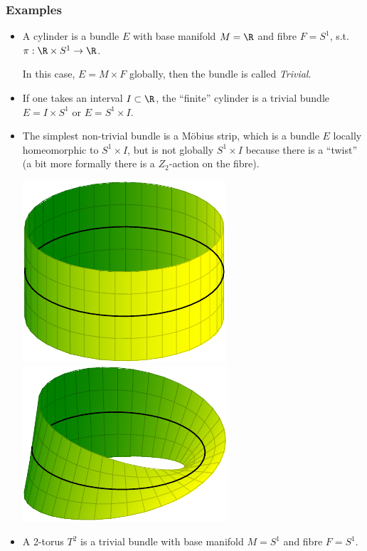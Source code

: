 \subsubsection*{Examples}
\begin{itemize}
\item A cylinder is a bundle $E$ with base manifold $M = \R$ and fibre $F = S^1$, s.t. $\pi: \R \times S^1 \to \R$.
  
  In this case, $E = M \times F$ globally, then the bundle is called \emph{Trivial}.
\item If one takes an interval $I \subset \R$, the ``finite'' cylinder is a trivial bundle $E = I \times S^1$ or $E = S^1 \times I$.
\item The simplest non-trivial bundle is a M\"obius strip, which is a bundle $E$ locally homeomorphic to $S^1 \times I$, but is not globally $S^1 \times I$ because there is a ``twist'' (a bit more formally there is a $Z_2$-action on the fibre).
  \begin{center}
    \includegraphics{Pict/tikz-cylinder.pdf}
    \hspace{5em}
    \includegraphics{Pict/tikz-moebius.pdf}
  \end{center}
\item  A 2-torus $T^2$ is a trivial bundle with base manifold $M = S^1$ and fibre $F = S^1$.
\end{itemize}

